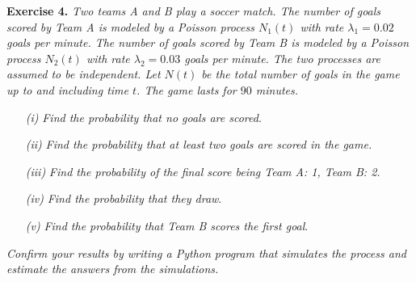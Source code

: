 
\textbf{Exercise 4. }\emph{Two teams A and B play a soccer match. The number of goals scored by Team A is modeled by a Poisson process \( N_{1}(t) \) with rate \( \lambda_{1} = 0.02 \) goals per minute. The number of goals scored by Team B is modeled by a Poisson process \( N_{2}(t)\) with rate \( \lambda_{2} = 0.03\) goals per minute. The two processes are assumed to be independent. Let \( N(t) \) be the total number of goals in the game up to and including time \( t \). The game lasts for \( 90 \) minutes.}
\begin{enumerate}
  \item[\textit{(i)}] \emph{Find the probability that no goals are scored}.
  \item[\textit{(ii)}] \emph{Find the probability that at least two goals are scored in the game.}
  \item[\textit{(iii)}] \emph{Find the probability of the final score being Team A: 1, Team B: 2.}
  \item[\textit{(iv)}]  \emph{Find the probability that they draw}.
  \item[\textit{(v)}]  \emph{Find the probability that Team B scores the first goal}.
\end{enumerate}
\emph{Confirm your results by writing a Python program that simulates the process and estimate the answers from the simulations.}

